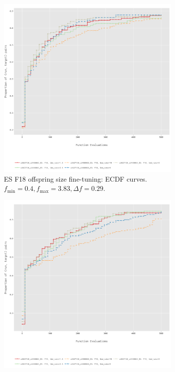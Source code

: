 \documentclass{article}
\begin{document}
\begin{figure}[!ht]
    \begin{subfigure}[h]{0.95\linewidth}
        \includegraphics[width=\linewidth]{es/f18/ECDF18lbd.png}
        \caption{ES F18 offspring size fine-tuning: ECDF curves. $f_{\min} = 0.4, f_{\max} = 3.83, \Delta f = 0.29$.}
    \end{subfigure}
    \hfill
    \begin{subfigure}[h]{0.95\linewidth}
        \includegraphics[width=\linewidth]{es/f19/ECDF19lbd.png}

\end{subfigure}
\end{figure}
\end{document}
